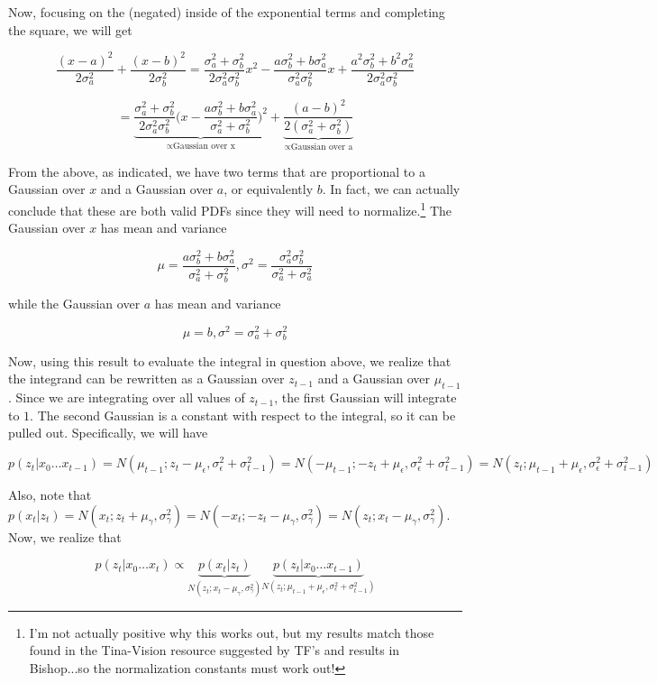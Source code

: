 \documentclass[submit]{harvardml}
\begin{document}
\begin{enumerate}
Now, focusing on the (negated) inside of the exponential terms and completing the square, we will get 

$$\frac{(x-a)^2}{2\sigma^2_a} + \frac{(x-b)^2}{2\sigma^2_b} = \frac{\sigma^2_a + \sigma^2_b}{2\sigma^2_a \sigma^2_b}x^2 - \frac{a\sigma^2_b+b\sigma^2_a}{\sigma^2_a\sigma^2_b}x +\frac{a^2\sigma^2_b + b^2\sigma^2_a}{2\sigma^2_a\sigma^2_b}$$ 

$$ = \underbrace{\frac{\sigma^2_a+\sigma^2_b}{2\sigma^2_a\sigma^2_b}\big(x-\frac{a\sigma^2_b +b\sigma^2_a}{\sigma^2_a+\sigma^2_b} \big)^2}_{\propto\textrm{Gaussian over x}} + \underbrace{\frac{(a-b)^2}{2(\sigma^2_a+\sigma^2_b)}}_{\propto\textrm{Gaussian over a}}$$

From the above, as indicated, we have two terms that are proportional to a Gaussian over $x$ and a Gaussian over $a$, or equivalently $b$. In fact, we can actually conclude that these are both valid PDFs since they will need to normalize.\footnote{I'm not actually positive why this works out, but my results match those found in the Tina-Vision resource suggested by TF's and results in Bishop...so the normalization constants must work out!} The Gaussian over $x$ has mean and variance

$$ \mu = \frac{a\sigma^2_b + b\sigma^2_a}{\sigma^2_a + \sigma^2_b}, \sigma^2 = \frac{\sigma^2_a\sigma^2_b}{\sigma^2_a+\sigma^2_a}$$

while the Gaussian over $a$ has mean and variance

$$\mu = b, \sigma^2 = \sigma^2_a + \sigma^2_b $$

Now, using this result to evaluate the integral in question above, we realize that the integrand can be rewritten as a Gaussian over $z_{t-1}$ and a Gaussian over $\mu_{t-1}$. Since we are integrating over all values of $z_{t-1}$, the first Gaussian will integrate to $1$. The second Gaussian is a constant with respect to the integral, so it can be pulled out. Specifically, we will have

$$p(z_t|x_0\dots x_{t-1}) = N(\mu_{t-1}; z_{t} - \mu_\epsilon, \sigma^2_\epsilon + \sigma^2_{t-1}) = N(-\mu_{t-1}; -z_{t} + \mu_\epsilon, \sigma^2_\epsilon + \sigma^2_{t-1}) = N(z_t; \mu_{t-1} + \mu_\epsilon, \sigma^2_\epsilon + \sigma^2_{t-1})  $$

Also, note that $p(x_t|z_t) = N(x_t;z_t+\mu_\gamma,\sigma^2_\gamma) = N(-x_t; -z_t-\mu_\gamma,\sigma^2_\gamma) = N(z_t; x_t-\mu_\gamma,\sigma^2_\gamma)$. Now, we realize that

$$p(z_t|x_0\dots x_t) \propto \underbrace{p(x_t|z_t)}_{N(z_t; x_t-\mu_\gamma,\sigma^2_\gamma)} \underbrace{p(z_t|x_0\dots x_{t-1})}_{N(z_t; \mu_{t-1} + \mu_\epsilon, \sigma^2_\epsilon + \sigma^2_{t-1}) } $$


\end{enumerate}
\end{document}
